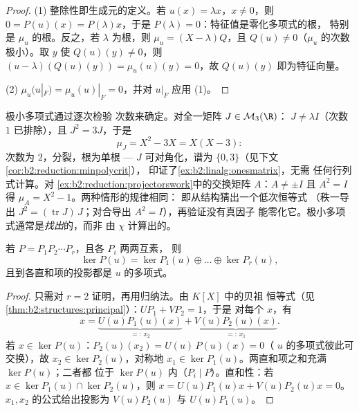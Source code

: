 \begin{proof}
(1) 整除性即生成元的定义。若 $u(x) =
\lambda x$，$x \neq 0$，则 $0 = P(u)(x) = P(\lambda)x$，于是
$P(\lambda) = 0$：特征值是零化多项式的根，
特别是 $\mu_u$ 的根。反之，若 $\lambda$ 为根，则 $\mu_u =
(X - \lambda)Q$，且 $Q(u) \neq 0$（$\mu_u$ 的次数极小）。取
$y$ 使 $Q(u)(y) \neq 0$，则 $(u - \lambda)(Q(u)(y)) = \mu_u(u)(y)
= 0$，故 $Q(u)(y)$ 即为特征向量。

(2) $\mu_u(u|_F) = \mu_u(u)|_F = 0$，并对 $u|_F$ 应用 (1)。
\end{proof}

\begin{example}[手工求极小多项式]\label{ex:b2:reduction:minpolyhand}
极小多项式通过逐次检验
次数来确定。对全一矩阵 $J \in \mathcal{M}_3(\R)$：
$J \neq \lambda I$（次数 $1$ 已排除），且 $J^2 = 3J$，于是
\[
\mu_J = X^2 - 3X = X(X - 3) :
\]
次数为 $2$，分裂，根为单根 --- $J$ 可对角化，谱为
$\{0, 3\}$（见下文\cref{cor:b2:reduction:minpolycrit}），
印证了\cref{ex:b2:linalg:onesmatrix}，无需
任何行列式计算。对
\cref{ex:b2:reduction:projectorswork}中的交换矩阵 $A$：$A \neq \pm I$ 且 $A^2
= I$ 得 $\mu_A = X^2 - 1$。两种情形的规律相同：
即从结构猜出一个低次恒等式
（秩一导出 $J^2 = (\operatorname{tr}J)\,J$；对合导出
$A^2 = I$），再验证没有真因子
能零化它。极小多项式通常是\emph{找出}的，而非
由 $\chi$ 计算出的。
\end{example}

\begin{theorem}[核分解引理]\label{thm:b2:reduction:kernels}
若 $P = P_1 P_2 \cdots P_r$，且各 $P_i$ 两两互素，
则
\[
\ker P(u) = \ker P_1(u) \oplus \dots \oplus \ker P_r(u),
\]
且到各直和项的投影都是 $u$ 的多项式。
\end{theorem}

\begin{proof}
只需对 $r = 2$ 证明，再用归纳法。由 $K[X]$ 中的贝祖
恒等式（见\cref{thm:b2:structures:principal}）：$U P_1 + V P_2 = 1$，于是
对每个 $x$，有
\[
x = \underbrace{U(u)P_1(u)(x)}_{=:\,x_2}
+ \underbrace{V(u)P_2(u)(x)}_{=:\,x_1}.
\]
若 $x \in \ker P(u)$：$P_2(u)(x_2) = U(u)\,P(u)(x) = 0$（
$u$ 的多项式彼此可交换），故 $x_2 \in \ker P_2(u)$，对称地 $x_1
\in \ker P_1(u)$。两直和项之和充满 $\ker P(u)$；二者都
位于 $\ker P(u)$ 内（$P_i \mid P$）。直和性：若 $x \in \ker P_1(u)
\cap \ker P_2(u)$，则 $x = U(u)P_1(u)x + V(u)P_2(u)x = 0$。
$x_1, x_2$ 的公式给出投影为 $V(u)P_2(u)$ 与
$U(u)P_1(u)$。
\end{proof}

